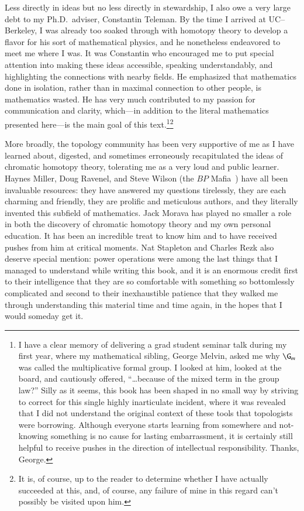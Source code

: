 Less directly in ideas but no less directly in stewardship, I also owe a very large debt to my Ph.D.\ adviser, Constantin Teleman.  By the time I arrived at UC--Berkeley, I was already too soaked through with homotopy theory to develop a flavor for his sort of mathematical physics, and he nonetheless endeavored to meet me where I was.  It was Constantin who encouraged me to put special attention into making these ideas accessible, speaking understandably, and highlighting the connections with nearby fields.  He emphasized that mathematics done in isolation, rather than in maximal connection to other people, is mathematics wasted.  He has very much contributed to my passion for communication and clarity, which---in addition to the literal mathematics presented here---is the main goal of this text.\footnote{I have a clear memory of delivering a grad student seminar talk during my first year, where my mathematical sibling, George Melvin, asked me why $\G_m$ was called the multiplicative formal group.  I looked at him, looked at the board, and cautiously offered, ``\ldots because of the mixed term in the group law?''  Silly as it seems, this book has been shaped in no small way by striving to correct for this single highly inarticulate incident, where it was revealed that I did not understand the original context of these tools that topologists were borrowing.  Although everyone starts learning from somewhere and not-knowing something is no cause for lasting embarrassment, it is certainly still helpful to receive pushes in the direction of intellectual responsibility.  Thanks, George.}\footnote{It is, of course, up to the reader to determine whether I have actually succeeded at this, and, of course, any failure of mine in this regard can't possibly be visited upon him.}

More broadly, the topology community has been very supportive of me as I have learned about, digested, and sometimes erroneously recapitulated the ideas of chromatic homotopy theory, tolerating me as a very loud and public learner.  Haynes Miller, Doug Ravenel, and Steve Wilson (the $BP$ Mafia~\cite{HopkinsOnRavenel}) have all been invaluable resources: they have answered my questions tirelessly, they are each charming and friendly, they are prolific and meticulous authors, and they literally invented this subfield of mathematics.  Jack Morava has played no smaller a role in both the discovery of chromatic homotopy theory and my own personal education.  It has been an incredible treat to know him and to have received pushes from him at critical moments.  Nat Stapleton and Charles Rezk also deserve special mention: power operations were among the last things that I managed to understand while writing this book, and it is an enormous credit first to their intelligence that they are so comfortable with something so bottomlessly complicated and second to their inexhaustible patience that they walked me through understanding this material time and time again, in the hopes that I would someday get it.

